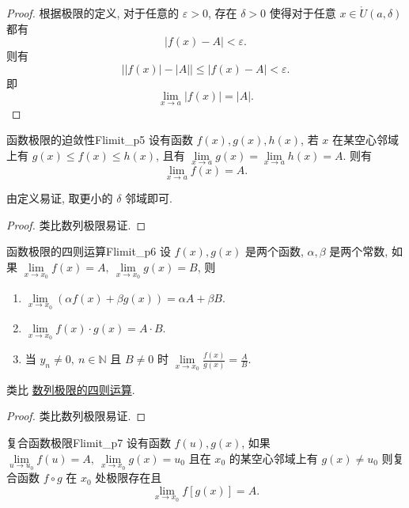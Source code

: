 \documentclass[cn,toc=twocol]{elegantbook}
\newcommand{\ITEMS}{\begin{enumerate}}
\newcommand{\ITEME}{\end{enumerate}}
\newcommand{\N}{\mathbb{N}}
\begin{document}
\begin{proof}
根据极限的定义, 对于任意的 $\varepsilon > 0$, 存在 $\delta > 0$ 使得对于任意 $x \in \mathring{U}(a,\delta)$ 都有
\[
	\lvert f(x) - A \rvert < \varepsilon.
\]
则有
\[
	\bigl\lvert \lvert f(x) \rvert - \lvert A \rvert \bigr\rvert \le \lvert f(x) - A \rvert < \varepsilon.
\]
即
\[
	\lim_{x \to a} \lvert f(x) \rvert = \lvert A \rvert.
\]
\end{proof}
\smallskip

\begin{theorem}{函数极限的迫敛性}{Flimit_p5}
	设有函数 $f(x) , g(x), h(x)$, 若 $x$ 在某空心邻域上有 $g(x) \le f(x) \le h(x)$, 且有 $\lim\limits_{x \to a} g(x) = \lim\limits_{x \to a} h(x) = A$. 则有
	\[
		\lim_{x \to a} f(x) = A.
	\]
\end{theorem}

\begin{idea*}
由定义易证, 取更小的 $\delta$ 邻域即可.
\end{idea*}

\begin{proof}
类比数列极限易证.
\end{proof}
\smallskip

\begin{theorem}{函数极限的四则运算}{Flimit_p6}
设 $f(x), g(x)$ 是两个函数, $\alpha, \beta$ 是两个常数, 如果 $\lim\limits_{x\to x_0} f(x) = A, \ \lim\limits_{x\to x_0} g(x) = B$, 则
	\ITEMS
		\item $\lim\limits_{x\to x_0} (\alpha f(x) + \beta g(x)) = \alpha A + \beta B$.
		\item $\lim\limits_{x\to x_0} f(x) \cdot g(x) = A \cdot B$.
		\item 当 $y_n\neq 0, \ n\in\N$ 且 $B \neq 0$ 时 $\lim\limits_{x\to x_0} \frac{f(x)}{g(x)} = \frac AB$.
	\ITEME
\end{theorem}

\begin{idea*}
类比 \hyperref[thm:Slimit_p5]{数列极限的四则运算}.
\end{idea*}

\begin{proof}
类比数列极限易证.
\end{proof}
\smallskip

\begin{theorem}{复合函数极限}{Flimit_p7}
设有函数 $f(u), g(x)$, 如果 $\lim\limits_{u\to u_0}f(u) = A, \ \lim\limits_{x\to x_0}g(x) = u_0$ 且在 $x_0$ 的某空心邻域上有 $g(x) \neq u_0$ 则复合函数 $f \circ g$ 在 $x_0$ 处极限存在且
\[
	\lim_{x\to x_0}f[g(x)] = A.
\]
\end{theorem}
\end{document}
